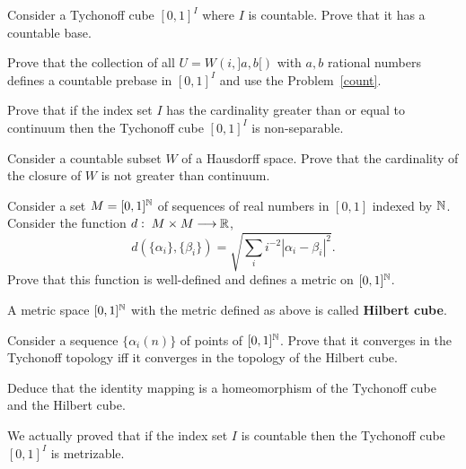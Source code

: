 \documentclass[12pt]{article}
\begin{document}
\begin{zadacha}[!]
Consider a Tychonoff cube $[0,1]^I$ where $I$ is countable. Prove that
it has a countable base.
\end{zadacha}

\begin{ukazanie}
  Prove that the collection of all $U=W(i, ]a,b[)$ with $a,b$ rational
  numbers defines a countable prebase in $[0,1]^I$ and use the
  Problem~\ref{count}.
\end{ukazanie}

\begin{zadacha}[**]
  Prove that if the index set $I$ has the cardinality greater than or
  equal to continuum then the Tychonoff cube $[0,1]^I$ is
  non-separable.
\end{zadacha}

\begin{ukazanie}
Consider a countable subset $W$ of a Hausdorff space. Prove that the
cardinality of the closure of $W$ is not greater than continuum.
\end{ukazanie}

\begin{zadacha}[!]
Consider a set $M=[0,1]^{\mathbb N}$ of sequences of real numbers in
$[0,1]$ indexed by ${\mathbb N}$. Consider the function $d:\; M\times M{\:\longrightarrow\:} {\mathbb R}$,
\[ 
d(\{\alpha_i\}, \{\beta_i\})= \sqrt{\sum_i i^{-2}|\alpha_i - \beta_i|^2}.
\]
Prove that this function is well-defined and defines a metric on
$[0,1]^{\mathbb N}$. 
\end{zadacha}

\begin{opredelenie}
A metric space $[0,1]^{\mathbb N}$ with the metric defined as above is called 
{\bf Hilbert cube}.
\end{opredelenie}

\begin{zadacha}[!]
  Consider a sequence $\{\alpha_i(n)\}$ of points of $[0,1]^{\mathbb N}$. Prove
  that it converges in the Tychonoff topology iff it converges in the
  topology of the Hilbert cube.
\end{zadacha}

\begin{zadacha}[*] 
Deduce that the identity mapping is a homeomorphism of the Tychonoff
cube and the Hilbert cube.
\end{zadacha}

\begin{zamechanie}
We actually proved that if the index set $I$ is countable then
the Tychonoff cube $[0,1]^I$ is metrizable.
\end{zamechanie}
\end{document}
